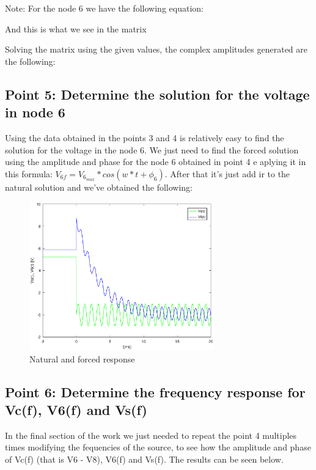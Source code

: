 Note: For the node 6 we have the following equation:


And this is what we see in the matrix

Solving the matrix using the given values, the complex amplitudes generated are the following:



\subsection{Point 5: Determine the solution for the voltage in node 6}

Using the data obtained in the points 3 and 4 is relatively easy to find the solution for the voltage in the node 6. We just need to find the forced solution using the amplitude and phase for the node 6 obtained in point 4 e aplying it in this formula: $V_{6f} = V_{6_{max}}*cos(w*t + \phi_{6})$. After that it's just add ir to the natural solution and we've obtained the following:

\begin{figure}[H]
\centering
\includegraphics[width = 8cm]{Solution.eps}
\caption {Natural and forced response}
\end{figure}


\subsection{Point 6: Determine the frequency response for Vc(f), V6(f) and Vs(f)}

In the final section of the work we just needed to repeat the point 4 multiples times modifying the fequencies of the source, to see how the amplitude and phase of Vc(f) (that is V6 - V8), V6(f) and Vs(f). The results can be seen below.

